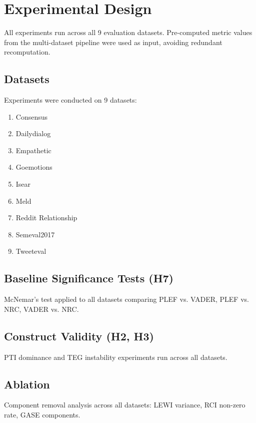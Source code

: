 
\section{Experimental Design}

All experiments run across all 9 evaluation datasets. Pre-computed metric values from the multi-dataset pipeline 
were used as input, avoiding redundant recomputation.

\subsection{Datasets}
Experiments were conducted on 9 datasets:
\begin{enumerate}
  \item Consensus
  \item Dailydialog
  \item Empathetic
  \item Goemotions
  \item Isear
  \item Meld
  \item Reddit Relationship
  \item Semeval2017
  \item Tweeteval
\end{enumerate}

\subsection{Baseline Significance Tests (H7)}
McNemar's test applied to all datasets comparing PLEF vs. VADER, 
PLEF vs. NRC, VADER vs. NRC.

\subsection{Construct Validity (H2, H3)}
PTI dominance and TEG instability experiments run across all datasets.

\subsection{Ablation}
Component removal analysis across all datasets: LEWI variance, 
RCI non-zero rate, GASE components.
